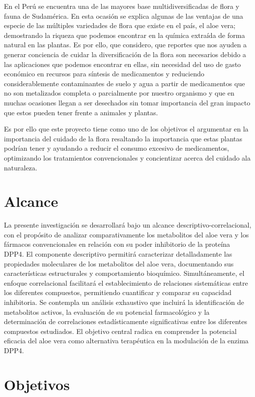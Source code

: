En el Perú se encuentra una de las mayores base multidiversificadas de flora y fauna de Sudamérica. En esta ocasión se explica algunas de las ventajas de una especie de las múltiples variedades de flora que existe en el país, el aloe vera; demostrando la riqueza que podemos encontrar en la química extraída de forma natural en las plantas. Es por ello, que considero, que reportes que nos ayuden a generar conciencia de cuidar la diversificación de la flora son necesarios debido a las aplicaciones que podemos encontrar en ellas, sin necesidad del uso de gasto económico en recursos para síntesis de medicamentos y reduciendo considerablemente contaminantes de suelo y agua a partir de medicamentos que no son metalizados completa o parcialmente por nuestro organismo y que en muchas ocasiones llegan a ser desechados  sin tomar importancia del gran impacto que estos pueden tener frente a animales y plantas.

Es por ello que este proyecto tiene como uno de los objetivos el argumentar en la importancia del cuidado de la flora resaltando la importancia que estas plantas podrían tener y ayudando a reducir el consumo excesivo de medicamentos, optimizando los tratamientos convencionales y concientizar acerca del cuidado ala naturaleza.

\section{Alcance}
La presente investigación se desarrollará bajo un alcance descriptivo-correlacional, con el propósito de analizar comparativamente los metabolitos del aloe vera y los fármacos convencionales en relación con su poder inhibitorio de la proteína DPP4.
El componente descriptivo permitirá caracterizar detalladamente las propiedades moleculares de los metabolitos del aloe vera, documentando sus características estructurales y comportamiento bioquímico. Simultáneamente, el enfoque correlacional facilitará el establecimiento de relaciones sistemáticas entre los diferentes compuestos, permitiendo cuantificar y comparar su capacidad inhibitoria.
Se contempla un análisis exhaustivo que incluirá la identificación de metabolitos activos, la evaluación de su potencial farmacológico y la determinación de correlaciones estadísticamente significativas entre los diferentes compuestos estudiados. El objetivo central radica en comprender la potencial eficacia del aloe vera como alternativa terapéutica en la modulación de la enzima DPP4.

\section{Objetivos}

